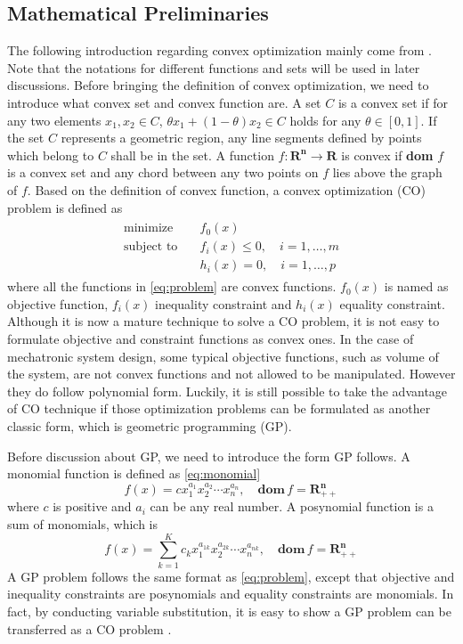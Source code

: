 \subsection{Mathematical Preliminaries}
The following introduction regarding convex optimization mainly come from \cite{boyd2004convex}. Note that the notations for different functions and sets will be used in later discussions. Before bringing the definition of convex optimization, we need to introduce what convex set and convex function are. A set $C$ is a convex set if for any two elements $x_1, x_2 \in C$, $\theta x_1+(1-\theta) x_2\in C$ holds for any $\theta \in \left[0,1\right]$. If the set $C$ represents a geometric region, any line segments defined by points which belong to $C$ shall be in the set. A function $f : \mathbf{R^n} \to \mathbf{R}$ is convex if \textbf{dom} $f$ is a convex set and any chord between any two points on $f$ lies above the graph of $f$. Based on the definition of convex function, a convex optimization (CO) problem is defined as 
\begin{align}
\begin{split}
\label{eq:problem}
\text{minimize} \quad  & f_0(x) \\
\text{subject to} \quad & f_i(x) \leq 0,\quad i=1,\ldots,m\\
                  & h_i(x) = 0,\quad i=1,\ldots,p
\end{split}
\end{align}
where all the functions in \ref{eq:problem} are convex functions. $f_0(x)$ is named as objective function, $f_i(x)$ inequality constraint and $h_i(x)$ equality constraint. Although it is now a mature technique to solve a CO problem, it is not easy to formulate objective and constraint functions as convex ones. In the case of mechatronic system design, some typical objective functions, such as volume of the system, are not convex functions and not allowed to be manipulated. However they do follow polynomial form. Luckily, it is still possible to take the advantage of CO technique if those optimization problems can be formulated as another classic form, which is geometric programming (GP).

Before discussion about GP, we need to introduce the form GP follows. A monomial function is defined as \ref{eq:monomial}
\begin{equation}
\label{eq:monomial}
f(x)=cx_1^{a_1}x_2^{a_2}\cdots x_n^{a_n}, \quad \mathbf{dom} \, f=\mathbf{R_{++}^n}
\end{equation}
where $c$ is positive and $a_i$ can be any real number. A posynomial function is a sum of monomials, which is 
\begin{equation}
\label{eq:posynomial}
f(x)=\sum_{k=1}^K c_kx_1^{a_{1k}}x_2^{a_{2k}}\cdots x_n^{a_{nk}}, \quad \mathbf{dom} \, f=\mathbf{R_{++}^n}
\end{equation}
A GP problem follows the same format as \ref{eq:problem}, except that objective and inequality constraints are posynomials and equality constraints are monomials. In fact, by conducting variable substitution, it is easy to show a GP problem can be transferred as a CO problem \cite{boyd2004convex}. 

